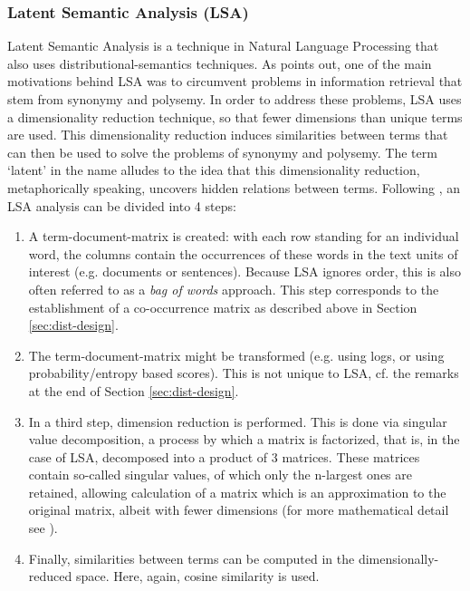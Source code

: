 \subsubsection{Latent Semantic Analysis (LSA)}
\label{sec:lsa}

Latent Semantic Analysis is a technique in Natural Language Processing that
also uses distributional-semantics techniques. As \citet{Dumais:2005}
points out, one of the main motivations behind LSA was to circumvent
problems in information retrieval that stem from synonymy and
polysemy. In order to address these problems, LSA uses a dimensionality
reduction technique, so that fewer dimensions than unique terms are
used. This dimensionality reduction induces similarities between terms
that can then be used to solve the problems of synonymy and
poly\-semy. The term `latent' in the name alludes to the idea that this
dimensionality reduction, metaphorically speaking, uncovers hidden
relations between terms. 
Following \citet[192--193]{Dumais:2005}, an LSA analysis can be divided
into 4 steps:
\begin{enumerate}
\item A term-document-matrix is created: with each row standing
  for an individual word, the columns contain the occurrences of these
  words in the text units of interest (e.g. documents or
  sentences). Because LSA ignores order, this is also often referred
  to as a \emph{bag of words} approach. This step corresponds to the
  establishment of a co-occurrence matrix as described above in
  Section \ref{sec:dist-design}.
\item The term-document-matrix might be transformed (e.g. using logs,
  or using probability/entropy based scores). 
This is not
  unique to LSA, cf. the remarks at the end of
  Section \ref{sec:dist-design}.
\item In a third step, dimension reduction is performed. This is done
  via singular value decomposition, a process by which a matrix is
  factorized, that is, in the case of LSA, decomposed into a product of 3
  matrices. These matrices contain so-called singular values, of which
  only the n-largest ones are retained, allowing calculation of a matrix
  which is an approximation to the original
  matrix, albeit with fewer dimensions (for more mathematical detail
  see \citealt{Landaueretal:1998}).
\item Finally, similarities between terms can be computed in the
 dimensionally-reduced space. Here, again, cosine similarity is used.
\end{enumerate}



